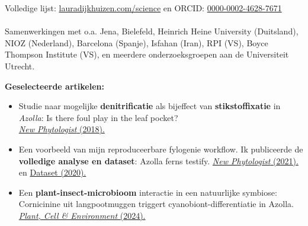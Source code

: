 \documentclass[a4paper,10pt]{article}
\begin{document}

\noindent Volledige lijst: \href{https://lauradijkhuizen.com/science}{lauradijkhuizen.com/science} en
\noindent ORCID: \textcolor[HTML]{A6CE39}{\faOrcid}\href{https://orcid.org/0000-0002-4628-7671}{0000-0002-4628-7671}
\\\\
\noindent Samenwerkingen met o.a. Jena, Bielefeld, Heinrich Heine University (Duitsland), NIOZ (Nederland), Barcelona (Spanje), Isfahan (Iran), RPI (VS), Boyce Thompson Institute (VS), en meerdere onderzoeksgroepen aan de Universiteit Utrecht.

\vspace{0.5em}

\noindent \textbf{Geselecteerde artikelen:}
\begin{itemize}
  \setlength{\itemsep}{0em}

  \item Studie naar mogelijke \textbf{denitrificatie} als bijeffect van \textbf{stikstoffixatie} in \emph{Azolla}: 
    Is there foul play in the leaf pocket? \\
    {\null\hfill\footnotesize\href{https://doi.org/10.1111/nph.14843}{\emph{New Phytologist} (2018).}}

  \item Een voorbeeld van mijn reproduceerbare fylogenie workflow. Ik publiceerde de \textbf{volledige analyse en dataset}: Azolla ferns testify. 
    {\null\hfill\footnotesize \href{https://doi.org/10.1111/nph.16896}{\emph{New Phytologist} (2021).}  en
    \href{https://doi.org/10.5281/zenodo.3959057}{Dataset (2020).}}

  \item Een \textbf{plant-insect-microbioom} interactie in een natuurlijke symbiose: Cornicinine uit langpootmuggen triggert cyanobiont-differentiatie in Azolla.
    {\null\hfill\footnotesize\href{https://doi.org/10.1111/pce.14907}{\emph{Plant, Cell \& Environment} (2024).} }
\end{itemize}

\vfill
\end{document}
